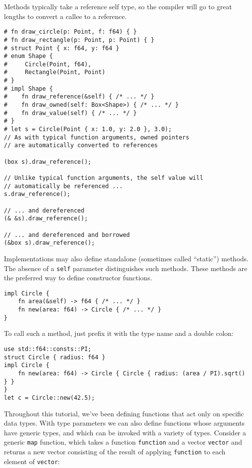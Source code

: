 \documentclass[]{article}
\begin{document}
Methods typically take a reference self type, so the compiler will go to
great lengths to convert a callee to a reference.

\begin{verbatim}
# fn draw_circle(p: Point, f: f64) { }
# fn draw_rectangle(p: Point, p: Point) { }
# struct Point { x: f64, y: f64 }
# enum Shape {
#     Circle(Point, f64),
#     Rectangle(Point, Point)
# }
# impl Shape {
#    fn draw_reference(&self) { /* ... */ }
#    fn draw_owned(self: Box<Shape>) { /* ... */ }
#    fn draw_value(self) { /* ... */ }
# }
# let s = Circle(Point { x: 1.0, y: 2.0 }, 3.0);
// As with typical function arguments, owned pointers
// are automatically converted to references

(box s).draw_reference();

// Unlike typical function arguments, the self value will
// automatically be referenced ...
s.draw_reference();

// ... and dereferenced
(& &s).draw_reference();

// ... and dereferenced and borrowed
(&box s).draw_reference();
\end{verbatim}

Implementations may also define standalone (sometimes called ``static'')
methods. The absence of a \texttt{self} parameter distinguishes such
methods. These methods are the preferred way to define constructor
functions.

\begin{verbatim}
impl Circle {
    fn area(&self) -> f64 { /* ... */ }
    fn new(area: f64) -> Circle { /* ... */ }
}
\end{verbatim}

To call such a method, just prefix it with the type name and a double
colon:

\begin{verbatim}
use std::f64::consts::PI;
struct Circle { radius: f64 }
impl Circle {
    fn new(area: f64) -> Circle { Circle { radius: (area / PI).sqrt() } }
}
let c = Circle::new(42.5);
\end{verbatim}


Throughout this tutorial, we've been defining functions that act only on
specific data types. With type parameters we can also define functions
whose arguments have generic types, and which can be invoked with a
variety of types. Consider a generic \texttt{map} function, which takes
a function \texttt{function} and a vector \texttt{vector} and returns a
new vector consisting of the result of applying \texttt{function} to
each element of \texttt{vector}:
\end{document}
